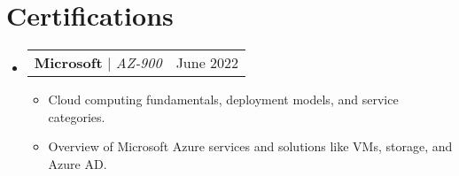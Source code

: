 \documentclass[letterpaper,11pt]{article}
\makeatletter
\newcommand{\resumeItem}[1]{
  \item\small{
    {#1 \vspace{-2pt}}
  }
}
\newcommand{\resumeProjectHeading}[2]{
    \item
    \begin{tabular*}{0.97\textwidth}{l@{\extracolsep{\fill}}r}
      \small#1 & #2 \\
    \end{tabular*}\vspace{-7pt}
}
\newcommand{\resumeSubHeadingListStart}{\begin{itemize}[leftmargin=0.15in, label={}]}
\newcommand{\resumeSubHeadingListEnd}{\end{itemize}}
\newcommand{\resumeItemListStart}{\begin{itemize}}
\newcommand{\resumeItemListEnd}{\end{itemize}\vspace{-5pt}}
\makeatother
\begin{document}
\section{Certifications}
    \resumeSubHeadingListStart
      \resumeProjectHeading
          {\textbf{Microsoft} $|$ \emph{AZ-900 }}{June 2022}
          
          \resumeItemListStart
            \resumeItem{Cloud computing fundamentals, deployment models, and service categories.}
            \resumeItem{Overview of Microsoft Azure services and solutions like VMs, storage, and Azure AD.}
          \resumeItemListEnd
\resumeSubHeadingListEnd
%
\end{document}
